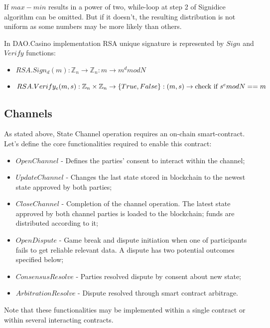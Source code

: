\begin{remark}
If  $max -  min$  results in a power of two, while-loop at step 2 of Signidice algorithm can be omitted. But if it doesn’t, the resulting distribution is not uniform as some numbers may be more likely than others.
\end{remark}

In DAO.Casino implementation RSA unique signature is represented by $Sign$ and $Verify$ functions:
\begin{itemize}
	\item $RSA.Sign_d(m): \mathbb{Z}_n \rightarrow \mathbb{Z}_n: m \rightarrow m^d mod N$
	\item $RSA.Verify_e(m, s): \mathbb{Z}_n \times \mathbb{Z}_n \rightarrow \{True, False\}: (m, s) \rightarrow \text{check if } \\ s^e mod N == m $
\end{itemize}

	\subsection{Channels}
As stated above, State Channel operation requires an on-chain smart-contract. Let’s define the core functionalities required to enable this contract:
\begin{itemize}
	\item $ OpenChannel $ - Defines the parties’ consent to interact within the channel;
	\item $ UpdateChannel $ - Changes the last state stored in blockchain to the newest state approved by both parties;
	\item $ CloseChannel $ - Completion of the channel operation. The latest state approved by both channel parties is loaded to the blockchain; funds are distributed according to it;
	\item $ OpenDispute $ - Game break and dispute initiation when one of participants fails to get reliable relevant data. A dispute has two potential outcomes specified below;
	\item $ ConsensusResolve $ - Parties resolved dispute by consent about new state;
	\item $ ArbitrationResolve $ - Dispute resolved through smart contract arbitrage.
\end{itemize}

\begin{remark}
Note that these functionalities may be implemented within a single contract or within several interacting contracts.
\end{remark}

